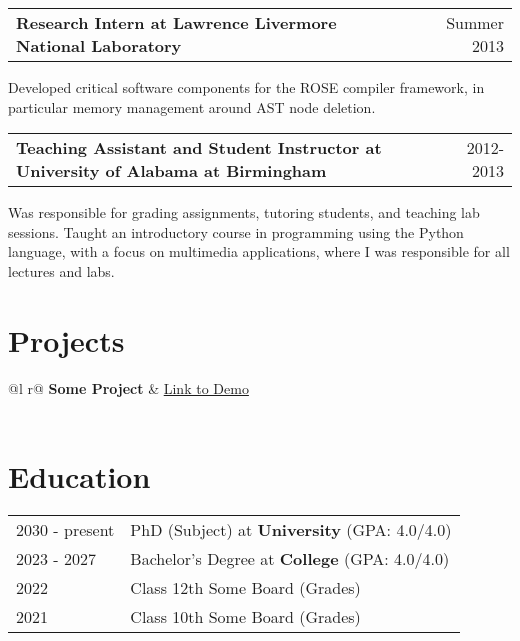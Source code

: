 \documentclass[a4paper,12pt]{article}
\makeatletter
\newenvironment{jobshort}[2]
    {
    \begin{tabularx}{\linewidth}{@{}l X r@{}}
    \textbf{#1} & \hfill &  #2 \\[3.75pt]
    \end{tabularx}
    }
    {
    }
\makeatother
\begin{document}
\begin{jobshort}{Research Intern at Lawrence Livermore National Laboratory}{Summer 2013}
Developed critical software components for the ROSE compiler framework, in particular memory management around AST node deletion.
\end{jobshort}

\begin{jobshort}{Teaching Assistant and Student Instructor at University of Alabama at Birmingham}{2012-2013}
Was responsible for grading assignments, tutoring students, and teaching lab sessions. Taught an introductory course in programming using the Python language, with a focus on multimedia applications, where I was responsible for all lectures and labs.
\end{jobshort}
  
\section{Projects}

\begin{tabularx}{\linewidth}{ @{}l r@{} }
\textbf{Some Project} & \hfill \href{https://some-link.com}{Link to Demo} \\[3.75pt]
  \\
\end{tabularx}

\section{Education}
\begin{tabularx}{\linewidth}{@{}l X@{}}	
2030 - present & PhD (Subject) at \textbf{University} \hfill \normalsize (GPA: 4.0/4.0) \\

2023 - 2027 & Bachelor's Degree at \textbf{College} \hfill (GPA: 4.0/4.0) \\ 

2022 & Class 12th Some Board \hfill  (Grades) \\

2021 & Class 10th Some Board \hfill  (Grades) \\
\end{tabularx}
\end{document}
